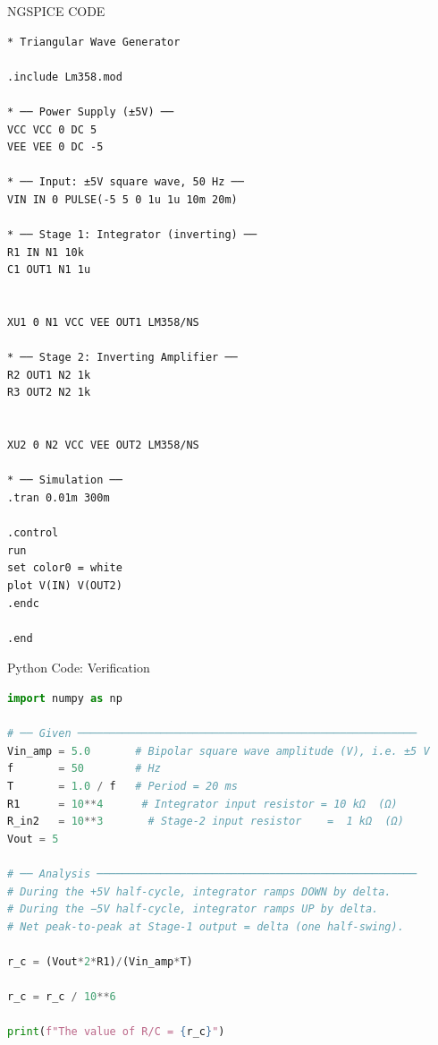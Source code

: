 \documentclass{beamer}
\numberwithin{equation}{section}
\theoremstyle{remark}
\begin{document}
\begin{frame}[fragile]{NGSPICE CODE}
\begin{lstlisting}[style=spice]
* Triangular Wave Generator 

.include Lm358.mod

* ── Power Supply (±5V) ──
VCC VCC 0 DC 5
VEE VEE 0 DC -5

* ── Input: ±5V square wave, 50 Hz ──
VIN IN 0 PULSE(-5 5 0 1u 1u 10m 20m)

* ── Stage 1: Integrator (inverting) ──
R1 IN N1 10k
C1 OUT1 N1 1u


XU1 0 N1 VCC VEE OUT1 LM358/NS

* ── Stage 2: Inverting Amplifier ──
R2 OUT1 N2 1k
R3 OUT2 N2 1k


XU2 0 N2 VCC VEE OUT2 LM358/NS

* ── Simulation ──
.tran 0.01m 300m

.control
run
set color0 = white
plot V(IN) V(OUT2)
.endc

.end
\end{lstlisting} 
\end{frame}


\begin{frame}[fragile]{Python Code: Verification}

\lstset{basicstyle=\ttfamily\scriptsize}
\begin{lstlisting}[language=Python]
import numpy as np

# ── Given ─────────────────────────────────────────────────────
Vin_amp = 5.0       # Bipolar square wave amplitude (V), i.e. ±5 V
f       = 50        # Hz
T       = 1.0 / f   # Period = 20 ms
R1      = 10**4      # Integrator input resistor = 10 kΩ  (Ω)
R_in2   = 10**3       # Stage-2 input resistor    =  1 kΩ  (Ω)
Vout = 5

# ── Analysis ──────────────────────────────────────────────────
# During the +5V half-cycle, integrator ramps DOWN by delta.
# During the −5V half-cycle, integrator ramps UP by delta.
# Net peak-to-peak at Stage-1 output = delta (one half-swing). 

r_c = (Vout*2*R1)/(Vin_amp*T) 

r_c = r_c / 10**6

print(f"The value of R/C = {r_c}")
\end{lstlisting}


\end{frame}
\end{document}

